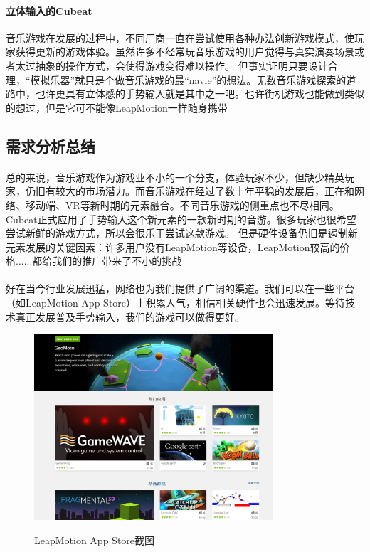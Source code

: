 \documentclass{article} \usepackage{CJK}
\begin{document}
\paragraph{立体输入的Cubeat}
音乐游戏在发展的过程中，不同厂商一直在尝试使用各种办法创新游戏模式，使玩家获得更新的游戏体验。虽然许多不经常玩音乐游戏的用户觉得与真实演奏场景或者太过抽象的操作方式，会使得游戏变得难以操作。
但事实证明只要设计合理，“模拟乐器”就只是个做音乐游戏的最“navie”的想法。无数音乐游戏探索的道路中，也许更具有立体感的手势输入就是其中之一吧。也许街机游戏也能做到类似的想过，但是它可不能像LeapMotion一样随身携带
\subsection{需求分析总结}
\paragraph{}
总的来说，音乐游戏作为游戏业不小的一个分支，体验玩家不少，但缺少精英玩家，仍旧有较大的市场潜力。而音乐游戏在经过了数十年平稳的发展后，正在和网络、移动端、VR等新时期的元素融合。不同音乐游戏的侧重点也不尽相同。
Cubeat正式应用了手势输入这个新元素的一款新时期的音游。很多玩家也很希望尝试新鲜的游戏方式，所以会很乐于尝试这款游戏。
但是硬件设备仍旧是遏制新元素发展的关键因素：许多用户没有LeapMotion等设备，LeapMotion较高的价格......都给我们的推广带来了不小的挑战
\paragraph{}
好在当今行业发展迅猛，网络也为我们提供了广阔的渠道。我们可以在一些平台（如LeapMotion App Store）上积累人气，相信相关硬件也会迅速发展。等待技术真正发展普及手势输入，我们的游戏可以做得更好。
\begin{figure}[H]
  \centering
  \includegraphics[width=24em]{leapMotionAppStore.png}\\
  \caption{LeapMotion App Store截图}\label{3-5}
\end{figure}
\newpage
\end{document}
